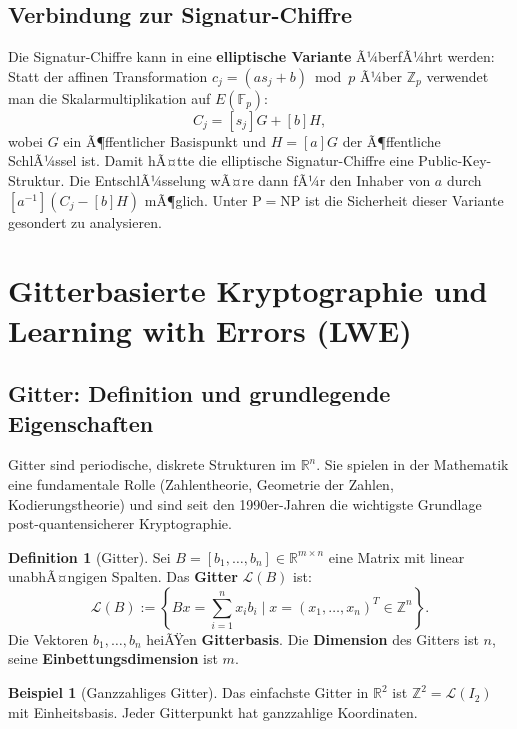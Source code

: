 ﻿\documentclass[a4paper,12pt]{scrreprt}
\theoremstyle{definition}
\newtheorem{definition}{Definition}[section]
\newtheorem{beispiel}{Beispiel}[section]
\begin{document}
\subsection{Verbindung zur Signatur-Chiffre}

Die Signatur-Chiffre kann in eine \textbf{elliptische Variante} Ã¼berfÃ¼hrt werden: Statt der affinen Transformation $c_j = (as_j + b)\bmod p$ Ã¼ber $\mathbb{Z}_p$ verwendet man die Skalarmultiplikation auf $E(\mathbb{F}_p)$:
\[
C_j = [s_j]G + [b]H,
\]
wobei $G$ ein Ã¶ffentlicher Basispunkt und $H = [a]G$ der Ã¶ffentliche SchlÃ¼ssel ist. Damit hÃ¤tte die elliptische Signatur-Chiffre eine Public-Key-Struktur. Die EntschlÃ¼sselung wÃ¤re dann fÃ¼r den Inhaber von $a$ durch $[a^{-1}](C_j - [b]H)$ mÃ¶glich. Unter $\mathrm{P}=\mathrm{NP}$ ist die Sicherheit dieser Variante gesondert zu analysieren.

\section{Gitterbasierte Kryptographie und Learning with Errors (LWE)}

\subsection{Gitter: Definition und grundlegende Eigenschaften}

Gitter sind periodische, diskrete Strukturen im $\mathbb{R}^n$. Sie spielen in der Mathematik eine fundamentale Rolle (Zahlentheorie, Geometrie der Zahlen, Kodierungstheorie) und sind seit den 1990er-Jahren die wichtigste Grundlage post-quantensicherer Kryptographie.

\begin{definition}[Gitter]
Sei $B = [b_1, \ldots, b_n] \in \mathbb{R}^{m \times n}$ eine Matrix mit linear unabhÃ¤ngigen Spalten. Das \textbf{Gitter} $\mathcal{L}(B)$ ist:
\[
\mathcal{L}(B) := \left\{ Bx = \sum_{i=1}^n x_i b_i \;\Big|\; x = (x_1,\ldots,x_n)^T \in \mathbb{Z}^n \right\}.
\]
Die Vektoren $b_1,\ldots,b_n$ heiÃŸen \textbf{Gitterbasis}. Die \textbf{Dimension} des Gitters ist $n$, seine \textbf{Einbettungsdimension} ist $m$.
\end{definition}

\begin{beispiel}[Ganzzahliges Gitter]
Das einfachste Gitter in $\mathbb{R}^2$ ist $\mathbb{Z}^2 = \mathcal{L}(I_2)$ mit Einheitsbasis. Jeder Gitterpunkt hat ganzzahlige Koordinaten.
\end{beispiel}
\end{document}
